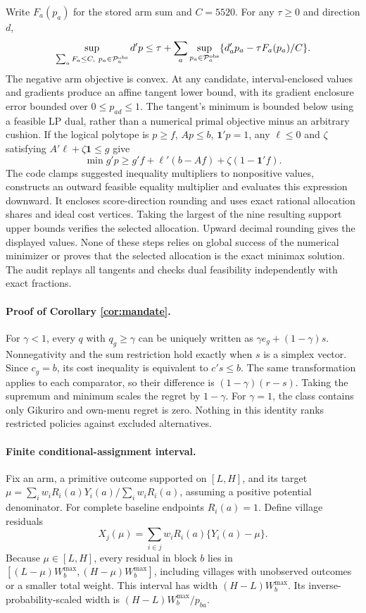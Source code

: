 \documentclass[11pt]{article}
\begin{document}
Write $F_a(p_a)$ for the stored arm sum and $C=5520$. For any $\tau\geq0$ and direction $d$,
\[
 \sup_{\sum_aF_a\leq C,\ p_a\in\mathcal P_a^{\rm obs}}d'p
 \leq\tau+\sum_a\sup_{p_a\in\mathcal P_a^{\rm obs}}\{d_a'p_a-\tau F_a(p_a)/C\}.
\]
The negative arm objective is convex. At any candidate, interval-enclosed values and gradients produce an affine tangent lower bound, with its gradient enclosure error bounded over $0\leq p_{ad}\leq1$. The tangent's minimum is bounded below using a feasible LP dual, rather than a numerical primal objective minus an arbitrary cushion. If the logical polytope is $p\geq f$, $Ap\leq b$, $\boldsymbol1'p=1$, any $\ell\leq0$ and $\zeta$ satisfying $A'\ell+\zeta\boldsymbol1\leq g$ give
\[
 \min g'p\geq g'f+\ell'(b-Af)+\zeta(1-\boldsymbol1'f).
\]
The code clamps suggested inequality multipliers to nonpositive values, constructs an outward feasible equality multiplier and evaluates this expression downward. It encloses score-direction rounding and uses exact rational allocation shares and ideal cost vertices. Taking the largest of the nine resulting support upper bounds verifies the selected allocation. Upward decimal rounding gives the displayed values. None of these steps relies on global success of the numerical minimizer or proves that the selected allocation is the exact minimax solution. The audit replays all tangents and checks dual feasibility independently with exact fractions.

\paragraph{Proof of Corollary \ref{cor:mandate}.}
For $\gamma<1$, every $q$ with $q_g\geq\gamma$ can be uniquely written as $\gamma e_g+(1-\gamma)s$. Nonnegativity and the sum restriction hold exactly when $s$ is a simplex vector. Since $c_g=b$, its cost inequality is equivalent to $c's\leq b$. The same transformation applies to each comparator, so their difference is $(1-\gamma)(r-s)$. Taking the supremum and minimum scales the regret by $1-\gamma$. For $\gamma=1$, the class contains only Gikuriro and own-menu regret is zero. Nothing in this identity ranks restricted policies against excluded alternatives.

\paragraph{Finite conditional-assignment interval.}
Fix an arm, a primitive outcome supported on $[L,H]$, and its target
$\mu=\sum_iw_iR_i(a)Y_i(a)/\sum_iw_iR_i(a)$, assuming a positive potential denominator. For complete baseline endpoints $R_i(a)=1$. Define village residuals
\[
 X_j(\mu)=\sum_{i\in j}w_iR_i(a)\{Y_i(a)-\mu\}.
\]
Because $\mu\in[L,H]$, every residual in block $b$ lies in $[(L-\mu)W_b^{\max},(H-\mu)W_b^{\max}]$, including villages with unobserved outcomes or a smaller total weight. This interval has width $(H-L)W_b^{\max}$. Its inverse-probability-scaled width is $(H-L)W_b^{\max}/p_{ba}$.
\end{document}
